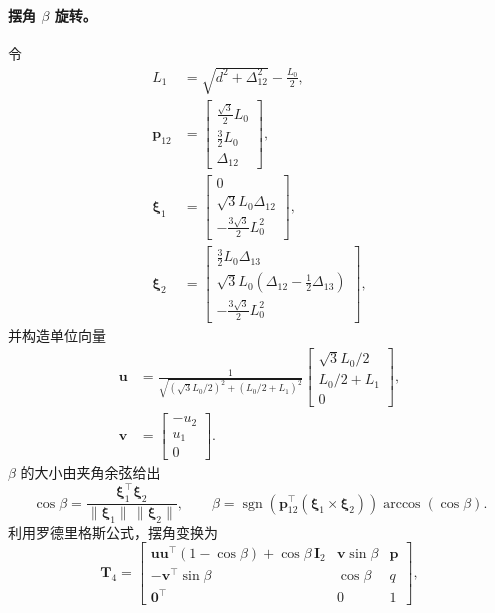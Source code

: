 \documentclass[12pt,a4paper]{article}
\begin{document}
\paragraph{摆角 $\beta$ 旋转。} 
令
\begin{align}
  L_1 &= \sqrt{d^2 + \Delta_{12}^2} - \frac{L_0}{2},\\
  \bm p_{12} &= \begin{bmatrix}\frac{\sqrt{3}}{2}L_0\\ \frac{3}{2} L_0\\ \Delta_{12}\end{bmatrix},\\
  \bm \xi_1 &= \begin{bmatrix} 0\\ \sqrt{3} L_0 \Delta_{12}\\ -\frac{3\sqrt{3}}{2} L_0^2 \end{bmatrix},\\
  \bm \xi_2 &= \begin{bmatrix} \frac{3}{2} L_0 \Delta_{13}\\ \sqrt{3} L_0 \left(\Delta_{12} - \frac{1}{2}\Delta_{13}\right)\\ -\frac{3\sqrt{3}}{2} L_0^2 \end{bmatrix},
\end{align}
并构造单位向量
\begin{align}
  \bm u &= \frac{1}{\sqrt{(\sqrt{3}L_0/2)^2 + (L_0/2+L_1)^2}}\begin{bmatrix} \sqrt{3}L_0/2 \\ L_0/2 + L_1 \\ 0 \end{bmatrix},\\
  \bm v &= \begin{bmatrix} -u_2 \\ u_1 \\ 0 \end{bmatrix}.
\end{align}
$\beta$ 的大小由夹角余弦给出
\begin{equation}
  \cos\beta = \frac{\bm \xi_1^\top \bm \xi_2}{\lVert \bm \xi_1 \rVert\,\lVert \bm \xi_2 \rVert},\qquad
  \beta = \operatorname{sgn}\!\left(\bm p_{12}^\top (\bm \xi_1 \times \bm \xi_2)\right)\arccos(\cos\beta).
\end{equation}
利用罗德里格斯公式，摆角变换为
\begin{equation}
  \bm T_4 = \begin{bmatrix}
    \bm u\bm u^\top (1-\cos\beta) + \cos\beta\,\bm I_2 & \bm v\sin\beta & \bm p\\
    -\bm v^\top\sin\beta & \cos\beta & q \\
    \bm 0^\top & 0 & 1
  \end{bmatrix},
\end{equation}
\end{document}
